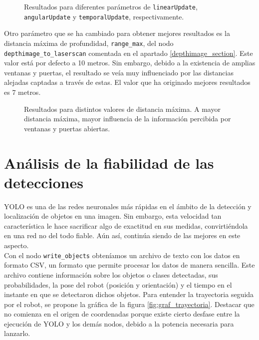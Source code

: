 \begin{figure}[H]
 \centering
 \caption{Resultados para diferentes parámetros de \texttt{linearUpdate}, \texttt{angularUpdate} y \texttt{temporalUpdate}, respectivamente.}
 \label{fig:scans_params}
\end{figure}

Otro parámetro que se ha cambiado para obtener mejores resultados es la distancia máxima de profundidad, \texttt{range\_max}, del nodo \texttt{depthimage\_to\_laserscan} comentada en el apartado \ref{depthimage_section}. Este valor está por defecto a 10 metros. Sin embargo, debido a la existencia de amplias ventanas y puertas, el resultado se veía muy influenciado por las distancias alejadas captadas a través de estas. El valor que ha originado mejores resultados es 7 metros.\\

\begin{figure}[H]
 \centering
 \caption{Resultados para distintos valores de distancia máxima. A mayor distancia máxima, mayor influencia de la información percibida por ventanas y puertas abiertas.}
 \label{fig:scans_range}
\end{figure}


\section{Análisis de la fiabilidad de las detecciones}

YOLO es una de las redes neuronales más rápidas en el ámbito de la detección y localización de objetos en una imagen. Sin embargo, esta velocidad tan característica le hace sacrificar algo de exactitud en sus medidas, convirtiéndola en una red no del todo fiable. Aún así, continúa siendo de las mejores en este aspecto.\\

Con el nodo \texttt{write\_objects} obteníamos un archivo de texto con los datos en formato CSV, un formato que permite procesar los datos de manera sencilla. Este archivo contiene información sobre los objetos o clases detectadas, sus probabilidades, la pose del robot (posición y orientación) y el tiempo en el instante en que se detectaron dichos objetos. Para entender la trayectoria seguida por el robot, se propone la gráfica de la figura \ref{fig:graf_trayectoria}. Destacar que no comienza en el origen de coordenadas porque existe cierto desfase entre la ejecución de YOLO y los demás nodos, debido a la potencia necesaria para lanzarlo.\\

